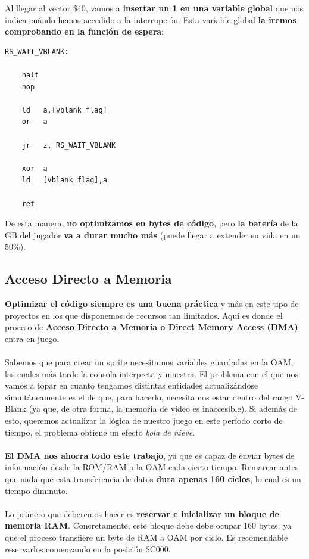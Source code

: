 Al llegar al vector \$40, vamos a \textbf{insertar un 1 en una variable global} que nos indica cuándo hemos accedido a la interrupción. Esta variable global \textbf{la iremos comprobando en la función de espera}:

\begin{lstlisting}[caption={Espera al Rango V-Blank: Método 2}, label={code:vblank2}]
RS_WAIT_VBLANK:

  	halt
  	nop
  	
  	ld 	 a,[vblank_flag]
  	or 	 a
  	
  	jr 	 z, RS_WAIT_VBLANK

  	xor  a
  	ld   [vblank_flag],a

	ret
\end{lstlisting}

De esta manera, \textbf{no optimizamos en bytes de código}, pero \textbf{la batería} de la GB del jugador \textbf{va a durar mucho más} (puede llegar a extender su vida en un 50\%).

\subsection{Acceso Directo a Memoria}

\textbf{Optimizar el código siempre es una buena práctica} y más en este tipo de proyectos en los que disponemos de recursos tan limitados. Aquí es donde el proceso de \textbf{Acceso Directo a Memoria o Direct Memory Access (DMA)} entra en juego.
\\ \\
Sabemos que para crear un sprite necesitamos variables guardadas en la OAM, las cuales más tarde la consola interpreta y muestra. El problema con el que nos vamos a topar en cuanto tengamos distintas entidades actualizándose simultáneamente es el de que, para hacerlo, necesitamos estar dentro del rango V-Blank (ya que, de otra forma, la memoria de vídeo es inaccesible). Si además de esto, queremos actualizar la lógica de nuestro juego en este período corto de tiempo, el problema obtiene un efecto \textit{bola de nieve}.
\\ \\
\textbf{El DMA nos ahorra todo este trabajo}, ya que es capaz de enviar bytes de información desde la ROM/RAM a la OAM cada cierto tiempo. Remarcar antes que nada que esta transferencia de datos \textbf{dura apenas 160 ciclos}, lo cual es un tiempo diminuto.
\\ \\
Lo primero que deberemos hacer es \textbf{reservar e inicializar un bloque de memoria RAM}. Concretamente, este bloque debe debe ocupar 160 bytes, ya que el proceso transfiere un byte de RAM a OAM por ciclo. Es recomendable reservarlos comenzando en la posición \$C000.


